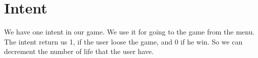 \section{Intent}
We have one intent in our game. We use it for going to the game from the menu. The intent return us 1, if the user loose the game, and 0 if he win. So we can decrement the number of life that the user have.